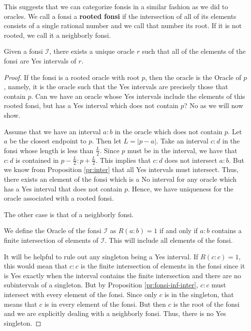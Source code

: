 \documentclass[12pt]{article}
\begin{document}
This suggests that we can categorize fonsis in a similar fashion as we did to oracles. We call a fonsi a \textbf{rooted fonsi} if the intersection of all of its elements consists of a single rational number and we call that number its root. If it is not rooted, we call it a neighborly fonsi. 

\begin{proposition}\label{pr:fon-oracle-exists}
Given a fonsi $\mathcal{I}$, there exists a unique oracle $r$ such that all of the elements of the fonsi are Yes intervals of $r$.
\end{proposition}

\begin{proof}
If the fonsi is a rooted oracle with root $p$, then the oracle is the Oracle of $p$, namely, it is the oracle such that the Yes intervals are precisely those that contain $p$. Can we have an oracle whose Yes intervals include the elements of this rooted fonsi, but has a Yes interval which does not contain $p$? No as we will now show. 

Assume that we have an interval $a:b$ in the oracle which does not contain $p$. Let $a$ be the closest endpoint to $p$. Then let $L = |p-a|$. Take an interval $c:d$ in the fonsi whose length is less than $\frac{L}{2}$. Since $p$ must be in the interval, we have that $c:d$ is contained in $p-\frac{L}{2}: p + \frac{L}{2}$. This implies that $c:d$ does not intersect $a:b$. But we know from Proposition \ref{pr:inter} that all Yes intervals must intersect. Thus, there exists an element of the fonsi which is a No interval for any oracle which has a Yes interval that does not contain $p$. Hence, we have uniqueness for the oracle associated with a rooted fonsi. 

The other case is that of a neighborly fonsi. 

We define the Oracle of the fonsi $\mathcal{I}$ as $R(a :b) = 1$ if and only if $a : b$ contains a finite intersection of elements of  $\mathcal{I}$. This will include all elements of the fonsi. 

It will be helpful to rule out any singleton being a Yes interval. If $R(c:c)=1$, this would mean that $c:c$ is the finite intersection of elements in the fonsi since it is Yes exactly when the interval contains the finite intersection and there are no subintervals of a singleton. But by Proposition \ref{pr:fonsi-inf-inter}, $c:c$ must intersect with every element of the fonsi. Since only $c$ is in the singleton, that means that $c$ is in every element of the fonsi. But then $c$ is the root of the fonsi and we are explicitly dealing with a neighborly fonsi. Thus, there is no Yes singleton. 



\end{proof}
\end{document}
